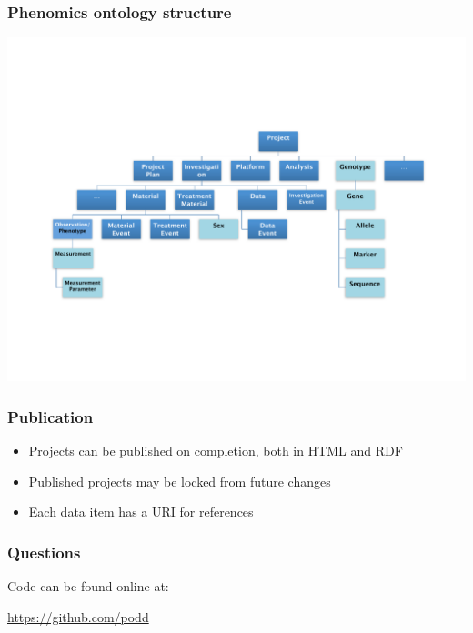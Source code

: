 \documentclass[12pt]{beamer}
\begin{document}
\begin{frame}
\frametitle{Phenomics ontology structure}

\begin{center}
 \includegraphics[scale=0.36,keepaspectratio=true]{./podd_ont.pdf}
\end{center}
\end{frame}

\begin{frame}
\frametitle{Publication}

\begin{itemize}
 \item Projects can be published on completion, both in HTML and RDF
\pause
 \item Published projects may be locked from future changes
\pause
 \item Each data item has a URI for references
\end{itemize}
\end{frame}

\begin{frame}
\frametitle{Questions}

Code can be found online at:

\url{https://github.com/podd}

\end{frame}
\end{document}
